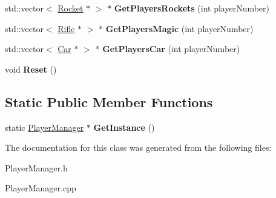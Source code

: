 \begin{DoxyCompactItemize}
\item 
std\+::vector$<$ \hyperlink{class_rocket}{Rocket} $\ast$ $>$ $\ast$ {\bfseries Get\+Players\+Rockets} (int player\+Number)\hypertarget{class_player_manager_a0bc4071c18aa269700c8eeef750e3597}{}\label{class_player_manager_a0bc4071c18aa269700c8eeef750e3597}

\item 
std\+::vector$<$ \hyperlink{class_rifle}{Rifle} $\ast$ $>$ $\ast$ {\bfseries Get\+Players\+Magic} (int player\+Number)\hypertarget{class_player_manager_a21b2d0824eb75a62a3104eb9c1406133}{}\label{class_player_manager_a21b2d0824eb75a62a3104eb9c1406133}

\item 
std\+::vector$<$ \hyperlink{class_car}{Car} $\ast$ $>$ $\ast$ {\bfseries Get\+Players\+Car} (int player\+Number)\hypertarget{class_player_manager_aaeb0f8ea825834fa17e4192061d1ff2a}{}\label{class_player_manager_aaeb0f8ea825834fa17e4192061d1ff2a}

\item 
void {\bfseries Reset} ()\hypertarget{class_player_manager_a4f4b15d5b40dd78989c908a2246579c2}{}\label{class_player_manager_a4f4b15d5b40dd78989c908a2246579c2}

\end{DoxyCompactItemize}
\subsection*{Static Public Member Functions}
\begin{DoxyCompactItemize}
\item 
static \hyperlink{class_player_manager}{Player\+Manager} $\ast$ {\bfseries Get\+Instance} ()\hypertarget{class_player_manager_aa97dbf29f9bd471b73fa8a40c90ac696}{}\label{class_player_manager_aa97dbf29f9bd471b73fa8a40c90ac696}

\end{DoxyCompactItemize}


The documentation for this class was generated from the following files\+:\begin{DoxyCompactItemize}
\item 
Player\+Manager.\+h\item 
Player\+Manager.\+cpp\end{DoxyCompactItemize}
